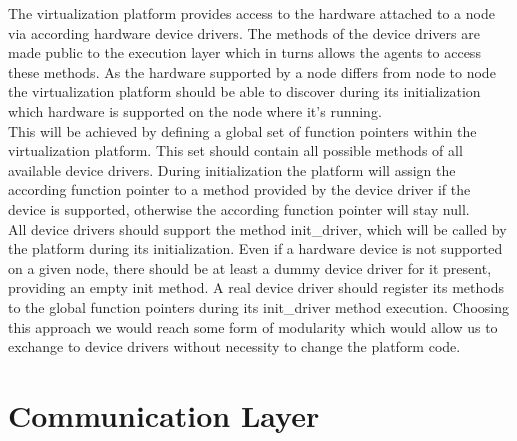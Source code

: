 \documentclass{scrreprt}
\begin{document}
The virtualization platform provides access to the hardware attached to a node via according hardware 
device drivers. The methods of the device drivers are made public to the execution layer which in turns 
allows the agents to access these methods. As the hardware supported by a node differs from node to node 
the virtualization platform should be able to discover during its initialization which hardware is supported 
on the node where it’s running. \newline
\\
\noindent
This will be achieved by defining a global set of function pointers within the virtualization platform. 
This set should contain all possible methods of all available device drivers. During initialization the platform 
will assign the according function pointer to a method provided by the device driver if the device is supported, 
otherwise the according function pointer will stay null. \newline
\\
\noindent
All device drivers should support the method init_driver, which will be called by the platform during its initialization. 
Even if a hardware device is not supported on a given node, there should be at least a dummy device driver for it present, 
providing an empty init method. A real device driver should register its methods to the global function pointers during its 
init_driver method execution. Choosing this approach we would reach some form of modularity which would allow us to exchange 
to device drivers without necessity to change the platform code.

\section{Communication Layer}
\end{document}
